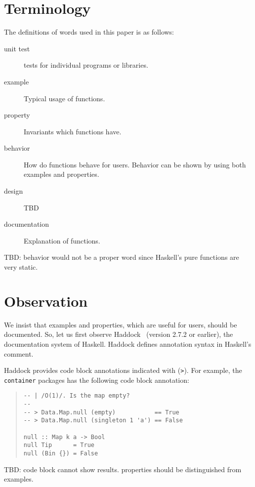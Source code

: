 \documentclass[preprint]{sigplanconf}
\begin{document}
\section{Terminology}

The definitions of words used in this paper is as follows:

\begin{description}
\item[unit test] tests for individual programs or libraries.
\item[example] Typical usage of functions.
\item[property] Invariants which functions have.
\item[behavior] How do functions behave for users. Behavior can be shown by using both examples and properties.
\item[design] TBD
\item[documentation] Explanation of functions.
\end{description}

TBD: behavior would not be a proper word since Haskell's pure
functions are very static.

\section{Observation}

We insist that examples and properties, which are useful for users, should be
documented.
So, let us first observe Haddock~\cite{haddock} (version 2.7.2 or earlier), the documentation system of Haskell. 
Haddock defines annotation syntax in Haskell's comment.

Haddock provides code block annotations indicated with ({\tt >}).
For example, the {\tt container} packages has the following code block annotation:

\begin{quote}
\small
\begin{verbatim}
-- | /O(1)/. Is the map empty?
--
-- > Data.Map.null (empty)           == True
-- > Data.Map.null (singleton 1 'a') == False

null :: Map k a -> Bool
null Tip      = True
null (Bin {}) = False
\end{verbatim}
\end{quote}

TBD: code block cannot show results. properties should be distinguished from examples.
\end{document}

